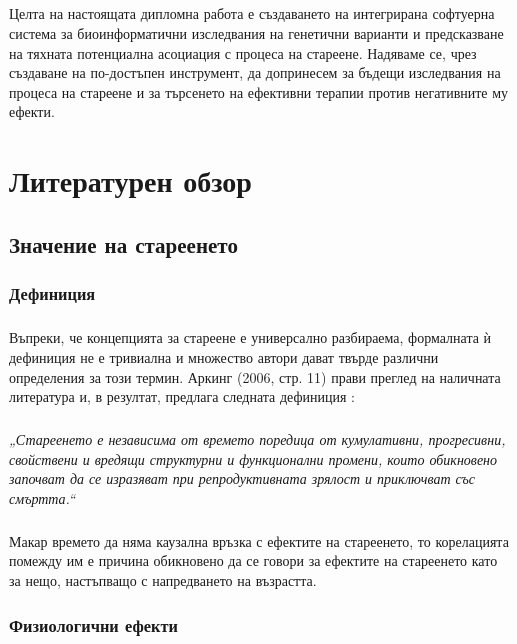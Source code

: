 \documentclass[pdftex,cyrillic,14pt,a4page,twoside]{extreport}
\begin{document}
\paragraph{}
Целта на настоящата дипломна работа е създаването на интегрирана софтуерна система за биоинформатични изследвания на генетични варианти и предсказване на тяхната потенциална асоциация с процеса на стареене. Надяваме се, чрез създаване на по-достъпен инструмент, да допринесем за бъдещи изследвания на процеса на стареене и за търсенето на ефективни терапии против негативните му ефекти.
            
\chapter{Литературен обзор}
\section{Значение на стареенето}
\subsection{Дефиниция}
\paragraph{}
Въпреки, че концепцията за стареене е универсално разбираема, формалната ѝ дефиниция не е тривиална и множество автори дават твърде различни определения за този термин. Аркинг (2006, стр. 11) прави преглед на наличната литература и, в резултат, предлага следната дефиниция \cite{arking2006biology}:

\paragraph{}
\textit{„Стареенето е независима от времето поредица от кумулативни, прогресивни, свойствени и вредящи структурни и функционални промени, които обикновено започват да се изразяват при репродуктивната зрялост и приключват със смъртта.“}

\paragraph{}
Макар времето да няма каузална връзка с ефектите на стареенето, то корелацията помежду им е причина обикновено да се говори за ефектите на стареенето като за нещо, настъпващо с напредването на възрастта.

\subsection{Физиологични ефекти}
\end{document}
